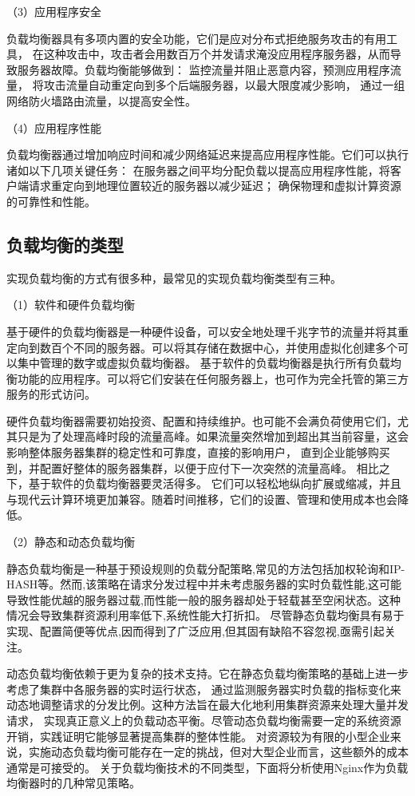 （3）应用程序安全

负载均衡器具有多项内置的安全功能，它们是应对分布式拒绝服务攻击的有用工具，
在这种攻击中，攻击者会用数百万个并发请求淹没应用程序服务器，从而导致服务器故障。负载均衡能够做到：
监控流量并阻止恶意内容，预测应用程序流量，
将攻击流量自动重定向到多个后端服务器，以最大限度减少影响，
通过一组网络防火墙路由流量，以提高安全性。

（4）应用程序性能

负载均衡器通过增加响应时间和减少网络延迟来提高应用程序性能。它们可以执行诸如以下几项关键任务：
在服务器之间平均分配负载以提高应用程序性能，将客户端请求重定向到地理位置较近的服务器以减少延迟；
确保物理和虚拟计算资源的可靠性和性能。

\subsection{负载均衡的类型}

实现负载均衡的方式有很多种，最常见的实现负载均衡类型有三种。

（1）软件和硬件负载均衡

基于硬件的负载均衡器是一种硬件设备，可以安全地处理千兆字节的流量并将其重定向到数百个不同的服务器。可以将其存储在数据中心，并使用虚拟化创建多个可以集中管理的数字或虚拟负载均衡器。
基于软件的负载均衡器是执行所有负载均衡功能的应用程序。可以将它们安装在任何服务器上，也可作为完全托管的第三方服务的形式访问。

硬件负载均衡器需要初始投资、配置和持续维护。也可能不会满负荷使用它们，尤其只是为了处理高峰时段的流量高峰。如果流量突然增加到超出其当前容量，这会影响整体服务器集群的稳定性和可靠度，直接的影响用户，
直到企业能够购买到，并配置好整体的服务器集群，以便于应付下一次突然的流量高峰。
相比之下，基于软件的负载均衡器要灵活得多\cite{常智2013高性能}。
它们可以轻松地纵向扩展或缩减，并且与现代云计算环境更加兼容。随着时间推移，它们的设置、管理和使用成本也会降低。

（2）静态和动态负载均衡

静态负载均衡是一种基于预设规则的负载分配策略,常见的方法包括加权轮询和IP-HASH等。然而,该策略在请求分发过程中并未考虑服务器的实时负载性能,这可能导致性能优越的服务器过载,而性能一般的服务器却处于轻载甚至空闲状态。这种情况会导致集群资源利用率低下,系统性能大打折扣。
尽管静态负载均衡具有易于实现、配置简便等优点,因而得到了广泛应用,但其固有缺陷不容忽视,亟需引起关注。

动态负载均衡依赖于更为复杂的技术支持。它在静态负载均衡策略的基础上进一步考虑了集群中各服务器的实时运行状态，
通过监测服务器实时负载的指标变化来动态地调整请求的分发比例。这种方法旨在最大化地利用集群资源来处理大量并发请求，
实现真正意义上的负载动态平衡。尽管动态负载均衡需要一定的系统资源开销，实践证明它能够显著提高集群的整体性能。
对资源较为有限的小型企业来说，实施动态负载均衡可能存在一定的挑战，但对大型企业而言，这些额外的成本通常是可接受的。
关于负载均衡技术的不同类型，下面将分析使用Nginx作为负载均衡器时的几种常见策略。

